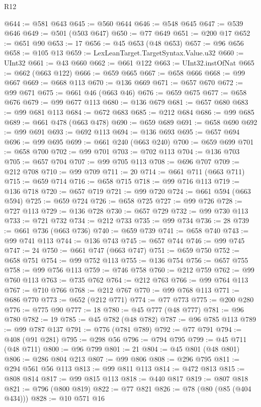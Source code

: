 \begin{lexlean}{R12}
\begin{coremodule}
@644 := @581 @643
@645 := @560 @644
@646 := @548 @645
@647 := @539 @646
@649 := @501 (@503 @647)
@650 := @77 @649
@651 := @200 @17
@652 := @651 @90
@653 := 17
@656 := @45 @653 (@48 @653)
@657 := @96 @656
@658 := @105 @13
@659 := LexLeanTarget.TargetSyntax.Value.u32
@660 := UInt32
@661 := @43 @660
@662 := @661 @122
@663 := UInt32.instOfNat
@665 := @662 (@663 @122)
@666 := @659 @665
@667 := @658 @666
@668 := @99 @667
@669 := @668 @113
@670 := @136 @669
@671 := @657 @670
@672 := @99 @671
@675 := @661 @46 (@663 @46)
@676 := @659 @675
@677 := @658 @676
@679 := @99 @677 @113
@680 := @136 @679
@681 := @657 @680
@683 := @99 @681 @113
@684 := @672 @683
@685 := @212 @684
@686 := @99 @685
@689 := @661 @478 (@663 @478)
@690 := @659 @689
@691 := @658 @690
@692 := @99 @691
@693 := @692 @113
@694 := @136 @693
@695 := @657 @694
@696 := @99 @695
@699 := @661 @240 (@663 @240)
@700 := @659 @699
@701 := @658 @700
@702 := @99 @701
@703 := @702 @113
@704 := @136 @703
@705 := @657 @704
@707 := @99 @705 @113
@708 := @696 @707
@709 := @212 @708
@710 := @99 @709
@711 := 20
@714 := @661 @711 (@663 @711)
@715 := @659 @714
@716 := @658 @715
@718 := @99 @716 @113
@719 := @136 @718
@720 := @657 @719
@721 := @99 @720
@724 := @661 @594 (@663 @594)
@725 := @659 @724
@726 := @658 @725
@727 := @99 @726
@728 := @727 @113
@729 := @136 @728
@730 := @657 @729
@732 := @99 @730 @113
@733 := @721 @732
@734 := @212 @733
@735 := @99 @734
@736 := 28
@739 := @661 @736 (@663 @736)
@740 := @659 @739
@741 := @658 @740
@743 := @99 @741 @113
@744 := @136 @743
@745 := @657 @744
@746 := @99 @745
@747 := 24
@750 := @661 @747 (@663 @747)
@751 := @659 @750
@752 := @658 @751
@754 := @99 @752 @113
@755 := @136 @754
@756 := @657 @755
@758 := @99 @756 @113
@759 := @746 @758
@760 := @212 @759
@762 := @99 @760 @113
@763 := @735 @762
@764 := @212 @763
@766 := @99 @764 @113
@767 := @710 @766
@768 := @212 @767
@770 := @99 @768 @113
@771 := @686 @770
@773 := @652 (@212 @771)
@774 := @77 @773
@775 := @200 @280
@776 := @775 @90
@777 := 18
@780 := @45 @777 (@48 @777)
@781 := @96 @780
@782 := 19
@785 := @45 @782 (@48 @782)
@787 := @96 @785 @113
@789 := @99 @787 @137
@791 := @776 (@781 @789)
@792 := @77 @791
@794 := @408 (@91 @281)
@795 := @298 @56
@796 := @794 @795
@799 := @45 @711 (@48 @711)
@800 := @96 @799
@801 := 21
@804 := @45 @801 (@48 @801)
@806 := @286 @804 @213
@807 := @99 @806
@808 := @296 @795
@811 := @294 @561 @56 @113
@813 := @99 @811 @113
@814 := @472 @813
@815 := @808 @814
@817 := @99 @815 @113
@818 := @440 @817
@819 := @807 @818
@821 := @796 (@800 @819)
@822 := @77 @821
@826 := @78 (@80 (@85 (@404 @434)))
@828 := @10 @571 @16

\end{coremodule}
\end{lexlean}

